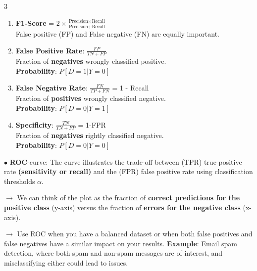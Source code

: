 \documentclass[letterpaper, 10.5pt,landscape]{article}
\begin{document}
\begin{multicols*}{3}
\begin{enumerate}[leftmargin=4mm]
    \item \textbf{F1-Score } = $\boxed{2 \times \frac{\text{Precision} \times \text{Recall}}{\text{Precision} + \text{Recall}}}$  \\
    False positive (FP) and False negative (FN) are equally important.
    \vspace{-2pt}

    \item \textbf{False Positive Rate}: \(\boxed{\frac{FP}{TN+FP}} \) \\
    Fraction of \textbf{negatives} wrongly classified positive. \\  \textbf{Probability}: $\boxed{P[D=1 | Y=0]}$
    \vspace{-2pt}

    \item \textbf{False Negative Rate}: \(\boxed{\frac{FN}{TP+FN}} \) = 1 - Recall  \\
    Fraction of \textbf{positives} wrongly classified negative.  \\
    \textbf{Probability}: $\boxed{P[D=0 | Y=1]}$
    \vspace{-2pt}
    
    \item \textbf{Specificity}: \(\boxed{\frac{TN}{TN+FP}} \) = 1-FPR  \\
    Fraction of \textbf{negatives} rightly classified negative.  \\\textbf{Probability}: $\boxed{P[D=0 | Y=0]}$
\end{enumerate}



$\bullet$ \textbf{ROC}-curve: The curve illustrates the trade-off between (TPR) true positive rate \textbf{(sensitivity or recall)} and the (FPR) false positive rate using classification thresholds $\alpha$.

$\rightarrow$ We can think of the plot as the fraction of \textbf{correct predictions for the positive class} (y-axis) versus the fraction of \textbf{errors for the negative class} (x-axis).


$\rightarrow$ Use ROC when you have a balanced dataset or when both false positives and false negatives have a similar impact on your results.
\textbf{Example}: Email spam detection, where both spam and non-spam messages are of interest, and misclassifying either could lead to issues.





\vspace{-3pt}


\end{multicols*}
\end{document}
